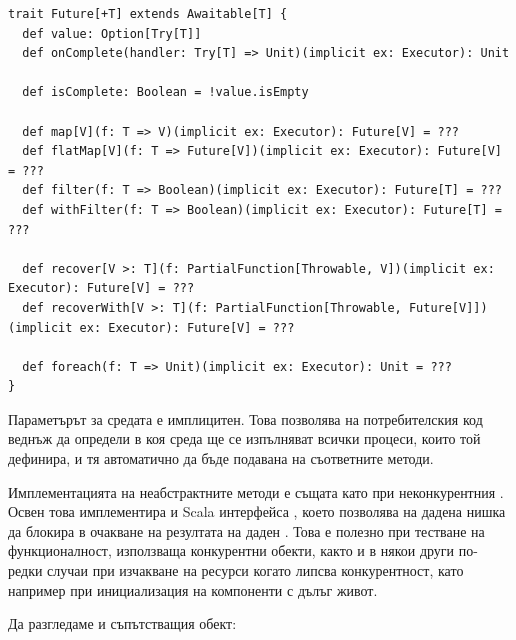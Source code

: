 \begin{lstlisting}[style=listing, caption={Конкурентен \englishterm{future}}]
trait Future[+T] extends Awaitable[T] {
  def value: Option[Try[T]]
  def onComplete(handler: Try[T] => Unit)(implicit ex: Executor): Unit

  def isComplete: Boolean = !value.isEmpty

  def map[V](f: T => V)(implicit ex: Executor): Future[V] = ???
  def flatMap[V](f: T => Future[V])(implicit ex: Executor): Future[V] = ???
  def filter(f: T => Boolean)(implicit ex: Executor): Future[T] = ???
  def withFilter(f: T => Boolean)(implicit ex: Executor): Future[T] = ???

  def recover[V >: T](f: PartialFunction[Throwable, V])(implicit ex: Executor): Future[V] = ???
  def recoverWith[V >: T](f: PartialFunction[Throwable, Future[V]])(implicit ex: Executor): Future[V] = ???

  def foreach(f: T => Unit)(implicit ex: Executor): Unit = ???
}
\end{lstlisting}

Параметърът за средата е имплицитен. Това позволява на потребителския код веднъж да определи в коя среда ще се изпълняват всички процеси, които той дефинира, и тя автоматично да бъде подавана на съответните методи.

Имплементацията на неабстрактните методи е същата като при неконкурентния . Освен това  имплементира и Scala интерфейса , което позволява на дадена нишка да блокира в очакване на резултата на даден . Това е полезно при тестване на функционалност, използваща конкурентни  обекти, както и в някои други по-редки случаи при изчакване на ресурси когато липсва конкурентност, като например при инициализация на компоненти с дълъг живот.

Да разгледаме и съпътстващия обект:

